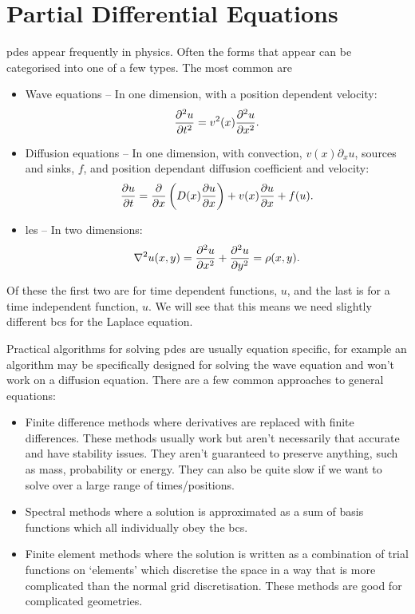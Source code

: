 \documentclass[a4paper]{article}
\begin{document}
    \section{Partial Differential Equations}
    \Glspl{pde} appear frequently in physics.
    Often the forms that appear can be categorised into one of a few types.
    The most common are
    \begin{itemize}
        \item Wave equations -- In one dimension, with a position dependent velocity:
        \[\pdv[2]{u}{t} = v^2(x)\pdv[2]{u}{x}.\]
        
        \item Diffusion equations -- In one dimension, with convection, \(v(x)\partial_x u\),  sources and sinks, \(f\), and position dependant diffusion coefficient and velocity:
        \[\pdv{u}{t} = \pdv{x}\left(D(x)\pdv{u}{x}\right) + v(x)\pdv{u}{x} + f(u).\]
        
        \item \Glspl{le} -- In two dimensions:
        \[\nabla^2 u(x, y) = \pdv[2]{u}{x} + \pdv[2]{u}{y} = \rho(x, y).\]
    \end{itemize}
    Of these the first two are for time dependent functions, \(u\), and the last is for a time independent function, \(u\).
    We will see that this means we need slightly different \glspl{bc} for the Laplace equation.
    
    Practical algorithms for solving \glspl{pde} are usually equation specific, for example an algorithm may be specifically designed for solving the wave equation and won't work on a diffusion equation.
    There are a few common approaches to general equations:
    \begin{itemize}
        \item Finite difference methods where derivatives are replaced with finite differences.
        These methods usually work but aren't necessarily that accurate and have stability issues.
        They aren't guaranteed to preserve anything, such as mass, probability or energy.
        They can also be quite slow if we want to solve over a large range of times/positions.
        
        \item Spectral methods where a solution is approximated as a sum of basis functions which all individually obey the \glspl{bc}.
        
        \item Finite element methods where the solution is written as a combination of trial functions on `elements' which discretise the space in a way that is more complicated than the normal grid discretisation.
        These methods are good for complicated geometries.
    \end{itemize}
    
\end{document}
